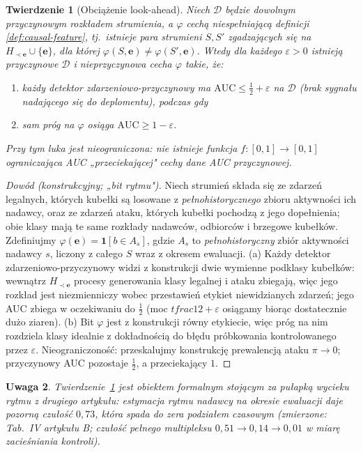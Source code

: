 \documentclass[11pt]{article}
\newtheorem{theorem}{Twierdzenie}
\newtheorem{remark}[theorem]{Uwaga}
\newcommand{\event}{\mathbf{e}}
\newcommand{\strict}{\prec}
\begin{document}
\begin{theorem}[Obciążenie look-ahead]
\label{thm:lookahead}
Niech $\mathcal{D}$ będzie dowolnym przyczynowym rozkładem strumienia,
a $\varphi$ cechą \emph{niespełniającą} definicji
\ref{def:causal-feature}, tj.\ istnieje para strumieni $S,S'$
zgadzających się na $H_{\strict\event}\cup\{\event\}$, dla której
$\varphi(S,\event)\ne\varphi(S',\event)$. Wtedy dla każdego
$\varepsilon>0$ istnieją przyczynowe $\mathcal{D}$ i nieprzyczynowa
cecha $\varphi$ takie, że:
\begin{enumerate}
\item[(a)] każdy detektor zdarzeniowo-przyczynowy ma
      $\mathrm{AUC}\le \tfrac12+\varepsilon$ na $\mathcal{D}$
      (brak sygnału nadającego się do deplomentu), podczas gdy
\item[(b)] sam próg na $\varphi$ osiąga $\mathrm{AUC}\ge 1-\varepsilon$.
\end{enumerate}
Przy tym luka jest \emph{nieograniczona}: nie istnieje funkcja
$f\colon[0,1]\to[0,1]$ ograniczająca AUC „przeciekającej" cechy dane AUC
przyczynowej.
\end{theorem}

\begin{proof}[Dowód (konstrukcyjny; „bit rytmu")]
Niech strumień składa się ze zdarzeń legalnych, których kubełki są
losowane z \emph{pełnohistorycznego} zbioru aktywności ich nadawcy,
oraz ze zdarzeń ataku, których kubełki pochodzą z jego dopełnienia; obie
klasy mają te same rozkłady nadawców, odbiorców i brzegowe kubełków.
Zdefiniujmy $\varphi(\event)=\mathbf{1}[b \in A_s]$, gdzie $A_s$ to
\emph{pełnohistoryczny} zbiór aktywności nadawcy $s$, liczony z
całego $S$ wraz z okresem ewaluacji.
(a) Każdy detektor zdarzeniowo-przyczynowy widzi z konstrukcji dwie
wymienne podklasy kubełków: wewnątrz $H_{\strict\event}$ procesy
generowania klasy legalnej i ataku zbiegają, więc jego rozkład jest
niezmienniczy wobec przestawień etykiet niewidzianych zdarzeń; jego AUC
zbiega w oczekiwaniu do $\tfrac12$ (moc $tfrac12+\varepsilon$ osiągamy
biorąc dostatecznie dużo ziaren).
(b) Bit $\varphi$ jest z konstrukcji równy etykiecie, więc próg na nim
rozdziela klasy idealnie z dokładnością do błędu próbkowania
kontrolowanego przez $\varepsilon$.
Nieograniczoność: przeskalujmy konstrukcję prewalencją ataku
$\pi\to0$; przyczynowy AUC pozostaje $\tfrac12$, a przeciekający $1$.
\end{proof}

\begin{remark}
Twierdzenie~\ref{thm:lookahead} jest obiektem formalnym stojącym za
\emph{pułapką wycieku rytmu} z drugiego artykułu: estymacja rytmu
nadawcy na okresie ewaluacji daje pozorną czułość $0{,}73$, która
spada do zera podziałem czasowym (zmierzone: Tab.~IV artykułu B;
czułość pełnego multipleksu $0{,}51\to0{,}14\to0{,}01$ w miarę
zacieśniania kontroli).
\end{remark}
\end{document}
